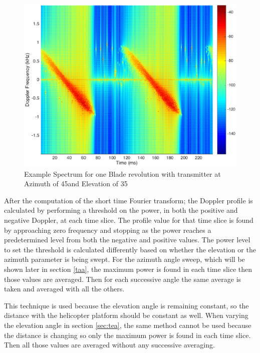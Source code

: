 \begin{figure}
	\begin{center}
		\includegraphics[width=15cm]{images/simulation/test_analysis_spectrogram.eps}
		\caption{Example Spectrum for one Blade revolution with transmitter at Azimuth of 45\textdegree \space and Elevation of 35\textdegree}
		\label{fig:test_spec}
	\end{center}
\end{figure}

After the computation of the short time Fourier transform; the Doppler profile is calculated by performing a threshold on the power, in both the positive and negative Doppler, at each time slice. The profile value for that time slice is found by approaching zero frequency and stopping as the power reaches a predetermined level from both the negative and positive values. The power level to set the threshold is calculated differently based on whether the elevation or the azimuth parameter is being swept. For the azimuth angle sweep, which will be shown later in section \ref{taa}, the maximum power is found in each time slice then those values are averaged. Then for each successive angle the same average is taken and averaged with all the others. 


This technique is used because the elevation angle is remaining constant, so the distance with the helicopter platform should be constant as well. When varying the elevation angle in section \ref{sec:tea}, the same method cannot be used because the distance is changing so only the maximum power is found in each time slice. Then all those values are averaged without any successive averaging.

